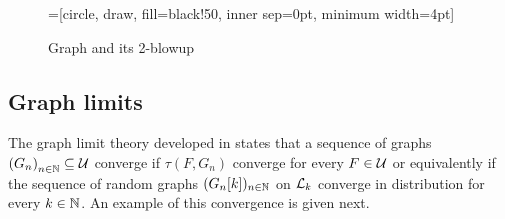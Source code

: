 \documentclass{article}
\begin{document}
\begin{figure}
  \centering
  =[circle, draw, fill=black!50,
                        inner sep=0pt, minimum width=4pt]
   \quad 
  \caption{Graph and its 2-blowup}
  \label{fig:blowup}
\end{figure}


\subsection{Graph limits}

The graph limit theory developed in \cite{lovasz04} states that a sequence of graphs $\left( G_n \right)_{n \in \N} \subseteq \Ug$ converge if $\tau(F, G_n)$ converge for every $F \in \Ug$ or equivalently if the sequence of random graphs $(G_n[k])_{n \in \N}$ on $\Lg_{k}$ converge in distribution for every $k \in \N$. An example of this convergence is given next.
\end{document}
